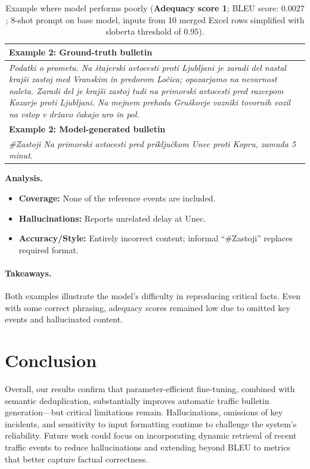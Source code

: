 \documentclass[fleqn,moreauthors,10pt]{ds_report}
\begin{document}
\vspace{1em}

\begin{table}[!ht]
\centering
\footnotesize
\renewcommand{\arraystretch}{1.15}
\setlength{\tabcolsep}{4pt}
\begin{tabularx}{\linewidth}{@{}X@{}}
\toprule
\textbf{Example 2: Ground-truth bulletin} \\
\midrule
\textit{Podatki o prometu. Na štajerski avtocesti proti Ljubljani je zaradi del nastal krajši zastoj med Vranskim in predorom Ločica; opozarjamo na nevarnost naleta. Zaradi del je krajši zastoj tudi na primorski avtocesti pred razcepom Kozarje proti Ljubljani. Na mejnem prehodu Gruškovje vozniki tovornih vozil na vstop v državo čakajo uro in pol.} \\
\midrule
\textbf{Example 2: Model-generated bulletin} \\
\midrule
\textit{\#Zastoji Na primorski avtocesti pred priključkom Unec proti Kopru, zamuda 5 minut.} \\
\bottomrule
\end{tabularx}
\caption{Example where model performs poorly (\textbf{Adequacy score 1}; BLEU score: $0.0027$; 8-shot prompt on base model, inputs from 10 merged Excel rows simplified with sloberta threshold of $0.95$).}

\end{table}

\FloatBarrier            %
\noindent \textbf{Analysis.}
\begin{itemize}[noitemsep, topsep=0pt]
  \item \textbf{Coverage:} None of the reference events are included.
  \item \textbf{Hallucinations:} Reports unrelated delay at Unec.
  \item \textbf{Accuracy/Style:} Entirely incorrect content; informal “\#Zastoji” replaces required format.
\end{itemize}

\paragraph{Takeaways.}  
Both examples illustrate the model's difficulty in reproducing critical facts. Even with some correct phrasing, adequacy scores remained low due to omitted key events and hallucinated content.

\section{Conclusion}
Overall, our results confirm that parameter-efficient fine-tuning, combined with semantic deduplication, substantially improves automatic traffic bulletin generation—but critical limitations remain. Hallucinations, omissions of key incidents, and sensitivity to input formatting continue to challenge the system's reliability. Future work could focus on incorporating dynamic retrieval of recent traffic events to reduce hallucinations and extending beyond BLEU to metrics that better capture factual correctness.
\end{document}
